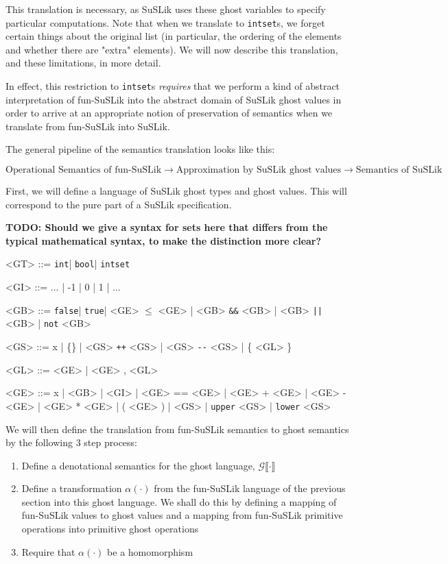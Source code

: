 \documentclass[10pt]{article}
\newcommand{\ttt}[1]{\texttt{#1}}
\newcommand{\ra}{\ensuremath{\rightarrow}}
\newcommand{\intS}{\ttt{int}}
\newcommand{\intset}{\ttt{intset}}
\newcommand{\bool}{\ttt{bool}}
\newcommand{\true}{\ttt{true}}
\newcommand{\false}{\ttt{false}}
\newcommand{\upperS}{\ttt{upper}}
\newcommand{\lowerS}{\ttt{lower}}
\newcommand{\sem} [1] {\llbracket#1\rrbracket}
\newcommand{\Gsem} [1] {\mathcal{G}\sem{#1}}
\begin{document}
\noindent
This translation is necessary, as SuSLik uses these ghost variables to specify particular computations. Note that when we translate to
\verb|intset|s, we forget certain things about the original list (in particular, the ordering of the elements and whether there are "extra"
elements). We will now describe this translation, and these limitations, in more detail.

In effect, this restriction to \verb|intset|s \textit{requires} that we perform a kind of abstract interpretation of fun-SuSLik into the
abstract domain of SuSLik ghost values in order to arrive at an appropriate notion of preservation of semantics when we
translate from fun-SuSLik into SuSLik.


\noindent
The general pipeline of the semantics translation looks like this:

\[
  {\scriptstyle \text{Operational Semantics of fun-SuSLik} \ra \text{Approximation by SuSLik ghost values} \ra \text{Semantics of SuSLik}}
\]

First, we will define a language of SuSLik ghost types and ghost values. This will correspond to the pure part of a SuSLik specification.

\textbf{TODO: Should we give a syntax for sets here that differs from the typical mathematical syntax, to make the distinction more clear?}
\\
\begin{grammar}
  <GT> ::= \intS | \bool | \intset

  <GI> ::= ... | -1 | 0 | 1 | ...

  <GB> ::= \false | \true | <GE> $\le$ <GE> | <GB> \ttt{\&\&} <GB> | <GB> \ttt{||} <GB> | \ttt{not}\; <GB>

  <GS> ::= x | \{\} | <GS> \ttt{++} <GS> | <GS> \ttt{-{}-} <GS> | \{ <GL> \}

  <GL> ::= <GE> | <GE> , <GL>

  <GE> ::= x | <GB> | <GI> | <GE> == <GE> | <GE> + <GE> | <GE> - <GE> | <GE> * <GE> | ( <GE> ) | <GS> | \upperS\; <GS> | \lowerS\; <GS>
\end{grammar}

We will then define the translation from fun-SuSLik semantics to ghost semantics by the following 3 step process:

\begin{enumerate}
  \item Define a denotational semantics for the ghost language, $\Gsem{\cdot}$
  \item Define a transformation $\alpha(\cdot)$ from the fun-SuSLik language of the previous section into this ghost language. We shall do this by defining a mapping of fun-SuSLik values to ghost values and a mapping from fun-SuSLik
primitive operations into primitive ghost operations
  \item Require that $\alpha(\cdot)$ be a homomorphism
\end{enumerate}
\end{document}
